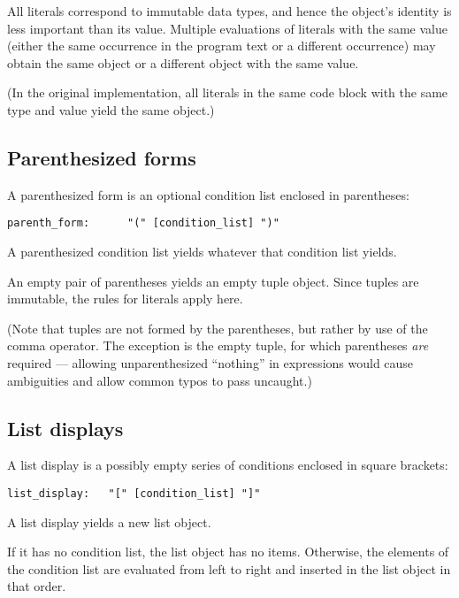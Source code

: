 All literals correspond to immutable data types, and hence the
object's identity is less important than its value.  Multiple
evaluations of literals with the same value (either the same
occurrence in the program text or a different occurrence) may obtain
the same object or a different object with the same value.

(In the original implementation, all literals in the same code block
with the same type and value yield the same object.)

\subsection{Parenthesized forms}

A parenthesized form is an optional condition list enclosed in
parentheses:

\begin{verbatim}
parenth_form:      "(" [condition_list] ")"
\end{verbatim}

A parenthesized condition list yields whatever that condition list
yields.

An empty pair of parentheses yields an empty tuple object.  Since
tuples are immutable, the rules for literals apply here.

(Note that tuples are not formed by the parentheses, but rather by use
of the comma operator.  The exception is the empty tuple, for which
parentheses {\em are} required --- allowing unparenthesized ``nothing''
in expressions would cause ambiguities and allow common typos to
pass uncaught.)

\subsection{List displays}

A list display is a possibly empty series of conditions enclosed in
square brackets:

\begin{verbatim}
list_display:   "[" [condition_list] "]"
\end{verbatim}

A list display yields a new list object.

If it has no condition list, the list object has no items.  Otherwise,
the elements of the condition list are evaluated from left to right
and inserted in the list object in that order.

